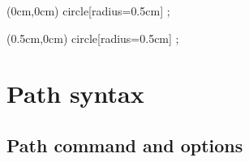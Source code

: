 \documentclass[a4paper]{article}
\begin{document}
\begin{codeexamplecolumns}
\begin{qdraw}[layers={background,main}]
  \fill[fill color={blue}]
    (0cm,0cm) circle[radius={0.5cm}] ;
  \begin{scope}[layer={background}]
    \fill (0.5cm,0cm) circle[radius={0.5cm}] ;
  \end{scope}
\end{qdraw}
\end{codeexamplecolumns}

\section{Path syntax}

\subsection{Path command and options}
\end{document}
